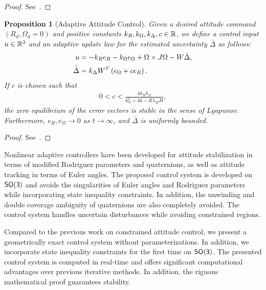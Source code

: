 \documentclass[letterpaper, 10 pt, conference]{ieeeconf}  %
\newtheorem{prop}{Proposition}
\begin{document}
\begin{proof}
See~.
\end{proof}
\begin{prop}[Adaptive Attitude Control]\label{prop:adaptive_control}
Given  a desired attitude command \( (R_d, \Omega_d = 0 )\) and positive constants \( k_R, k_\Omega, k_\Delta, c \in \mathbb{R} \), we define a control input \( u \in \mathbb{R}^3\) and an adaptive update law for the estimated uncertainty \( \bar{\Delta} \) as follows:
\begin{align}
	u &= - k_R e_R - k_\Omega e_\Omega + \Omega \times J \Omega - W \bar{\Delta} , \label{eqn:adaptive_control} \\
	\dot{\bar{\Delta}} &= k_\Delta W^T \left( e_\Omega + c e_R \right) . \label{eqn:delta_dot}
\end{align}
If \( c \) is chosen such that
\begin{gather}
	0 < c < \frac{4 k_R k_\Omega}{k_\Omega^2 + 4 k-R \lambda_M H} , \label{eqn:c_bound}
\end{gather}
  the zero equilibrium of the error vectors is stable in the sense of Lyapunov. Furthermore, $e_R,e_\Omega\rightarrow 0$ as $t\rightarrow\infty$, and $\bar\Delta$ is uniformly bounded.
\end{prop}
\begin{proof}
See~.
\end{proof}

Nonlinear adaptive controllers have been developed for attitude stabilization in terms of modified Rodriguez parameters and quaternions, as well as attitude tracking in terms of Euler angles. 
The proposed control system is developed on \(\mathsf{SO(3)}\) and avoids the singularities of Euler angles and Rodriguez parameters while incorporating state inequality constraints. 
In addition, the unwinding and double coverage ambiguity of quaternions are also completely avoided. 
The control system handles uncertain disturbances while avoiding constrained regions.

Compared to the previous work on constrained attitude control, we present a geometrically exact control system without parameterizations.
In addition, we incorporate state inequality constraints for the first time on \( \mathsf{SO(3)} \).
The presented control system is computed in real-time and offers significant computational advantages over previous iterative methods. 
In addition, the riguous mathematical proof guarantees stability.
\end{document}
